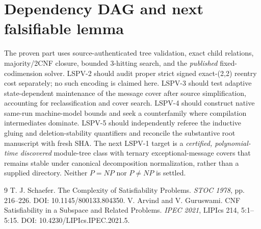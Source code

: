 \documentclass[10pt]{article}
\begin{document}
\section{Dependency DAG and next falsifiable lemma}
The proven part uses source-authenticated tree validation, exact child relations, majority/2CNF closure, bounded 3-hitting search, and the \emph{published} fixed-codimension solver. LSPV-2 should audit proper strict signed exact-(2,2) reentry cost separately; no such encoding is claimed here. LSPV-3 should test adaptive state-dependent maintenance of the message cover after source simplification, accounting for reclassification and cover search. LSPV-4 should construct native same-run machine-model bounds and seek a counterfamily where compilation intermediates dominate. LSPV-5 should independently referee the inductive gluing and deletion-stability quantifiers and reconcile the substantive root manuscript with fresh SHA. The next LSPV-1 target is a \emph{certified, polynomial-time discovered} module-tree class with ternary exceptional-message covers that remains stable under canonical decomposition normalization, rather than a supplied directory. Neither $P=NP$ nor $P\ne NP$ is settled.

\begin{thebibliography}{9}
 T. J. Schaefer. The Complexity of Satisfiability Problems. \emph{STOC 1978}, pp. 216--226. DOI: 10.1145/800133.804350.
 V. Arvind and V. Guruswami. CNF Satisfiability in a Subspace and Related Problems. \emph{IPEC 2021}, LIPIcs 214, 5:1--5:15. DOI: 10.4230/LIPIcs.IPEC.2021.5.
\end{thebibliography}
\end{document}
